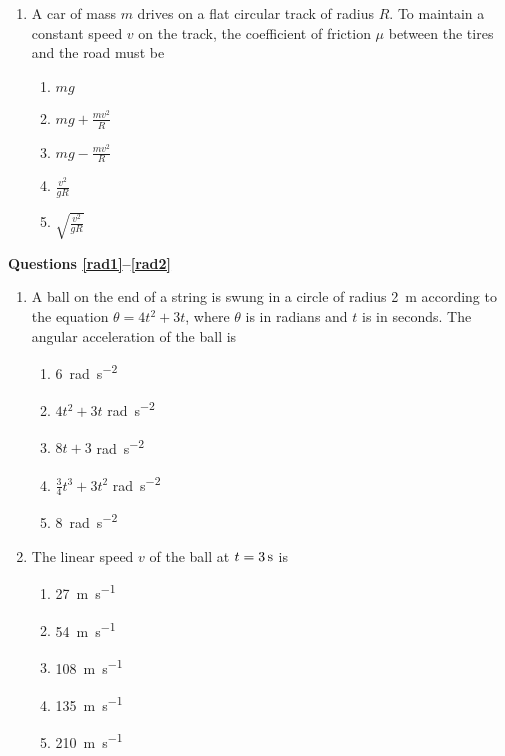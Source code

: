 \documentclass{../../../oss-apphys}
\begin{document}
\begin{multicols*}{2}
\begin{enumerate}[leftmargin=18pt,resume]
  \item A car of mass $m$ drives on a flat circular track of radius $R$. To
    maintain a constant speed $v$ on the track, the coefficient of friction
    $\mu$ between the tires and the road must be
    \begin{enumerate}[nosep,leftmargin=18pt,label=(\Alph*)]
    \item $\displaystyle mg$
    \item $\displaystyle mg+\frac{mv^2}{R}$
    \item $\displaystyle mg-\frac{mv^2}{R}$
    \item $\displaystyle \frac{v^2}{gR}$
    \item $\displaystyle \sqrt{\frac{v^2}{gR}}$
    \end{enumerate}
  \end{enumerate}
  \textbf{Questions \ref{rad1}--\ref{rad2}}
  \begin{enumerate}[leftmargin=18pt,resume]
  \item A ball on the end of a string is swung in a circle of radius
    \SI{2}{\metre} according to the equation $\theta = 4t^2+3t$, where $\theta$
    is in radians and $t$ is in seconds. The angular acceleration of the ball
    is
    \begin{enumerate}[nosep,leftmargin=18pt,label=(\Alph*)]
    \item\SI{6}{rad\per\second\squared}
    \item $4t^2 + 3t$ \si{rad\per\second\squared}
    \item $8t +3$ \si{rad\per\second\squared}
    \item $\displaystyle\frac{3}{4} t^3 + 3t^2$ \si{rad\per\second\squared}
    \item \SI{8}{rad\per\second\squared}
    \end{enumerate}
    \label{rad1}
    
  \item The linear speed $v$ of the ball at $t=\SI3\second$ is
    \begin{enumerate}[nosep,leftmargin=18pt,label=(\Alph*)]
    \item\SI{27 }{\metre\per\second}
    \item\SI{54 }{\metre\per\second}
    \item\SI{108}{\metre\per\second}
    \item\SI{135}{\metre\per\second}
    \item\SI{210}{\metre\per\second}
    \end{enumerate}
    \label{rad2}
    

\end{enumerate}
\end{multicols*}
\end{document}

